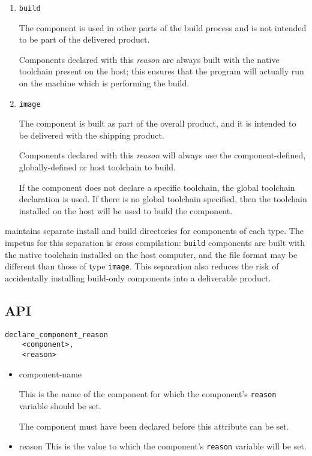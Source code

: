   \begin{enumerate}
  \item \texttt{build}

    The component is used in other parts of the build process and is
    not intended to be part of the delivered product.

    Components declared with this \emph{reason} are always built with
    the native toolchain present on the host; this ensures that the
    program will actually run on the machine which is performing the
    build.

  \item \texttt{image}

    The component is built as part of the overall product, and it is
    intended to be delivered with the shipping product.

    Components declared with this \emph{reason} will always use the
    component-defined, globally-defined or host toolchain to build.

    If the component does not declare a specific toolchain, the global
    toolchain declaration is used.  If there is no global toolchain
    specified, then the toolchain installed on the host will be used
    to build the component.

  \end{enumerate}

  \lmsbw maintains separate install and build directories for
  components of each type.  The impetus for this separation is cross
  compilation: \texttt{build} components are built with the native
  toolchain installed on the host computer, and the file format may be
  different than those of type \texttt{image}.  This separation also
  reduces the risk of accidentally installing build-only components
  into a deliverable product.

\subsection{API}

\begin{verbatim}
declare_component_reason
    <component>,
    <reason>
\end{verbatim}

\begin{itemize}
\item component-name

  This is the name of the component for which the component's
  \texttt{reason} variable should be set.

  The component must have been declared before this attribute can be
  set.

\item reason
  This is the value to which the component's \texttt{reason} variable
  will be set.

\end{itemize}

